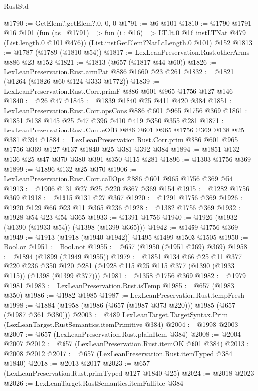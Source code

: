 \begin{lexlean}{RustStd}
\begin{coremodule}
@1790 := GetElem?.getElem?.{0, 0, 0}
@1791 := @6 @101
@1810 := @1790
    @1791
    @16
    @101
    (fun (as : @1791) => fun (i : @16) => LT.lt.{0} @16 instLTNat @479 (List.length.{0} @101 @476))
    (List.instGetElem?NatLtLength.{0} @101)
    @152
@1813 := @1787 (@1789 (@1810 @54))
@1817 := LexLeanPreservation.Rust.otherArms @886 @23 @152
@1821 := @1813 (@657 (@1817 @44 @60))
@1826 := LexLeanPreservation.Rust.armPat @886 @1660 @23 @261
@1832 := @1821 (@1264 (@1826 @60 @124 @333 @1772))
@1839 := LexLeanPreservation.Rust.Corr.primF @886 @601 @965 @1756 @127 @146
@1840 := @26 @47
@1845 := @1839 @1840 @25 @411 @420 @384
@1851 := LexLeanPreservation.Rust.Corr.opsCons @886 @601 @965 @1756 @369
@1861 := @1851 @138 @145 @25 @47 @396 @410 @419 @350 @355 @281
@1871 := LexLeanPreservation.Rust.Corr.eOfB @886 @601 @965 @1756 @369 @138 @25 @381 @394
@1884 := LexLeanPreservation.Rust.Corr.prim
    @886
    @601
    @965
    @1756
    @369
    @127
    @137
    @1840
    @25
    @381
    @392
    @384
@1894 := @1851 @132 @136 @25 @47 @370 @380 @391 @350 @115 @281
@1896 := @1303 @1756 @369
@1899 := @1896 @132 @25 @370
@1906 := LexLeanPreservation.Rust.Corr.callOps @886 @601 @965 @1756 @369 @54
@1913 := @1906 @131 @27 @25 @220 @367 @369 @154
@1915 := @1282 @1756 @369
@1918 := @1915 @131 @27 @367
@1920 := @1291 @1756 @369
@1926 := @1920 @129 @66 @23 @11 @365 @236
@1928 := @1382 @1756 @369
@1932 := @1928 @54 @23 @54 @365
@1933 := @1391 @1756
@1940 := @1926 (@1932 (@1390 (@1933 @54)) (@1398 (@1399 @365)))
@1942 := @1469 @1756 @369
@1949 := @1913 (@1918 (@1940 @1942)) @1495 @1499 @1503 @1505
@1950 := Bool.or
@1951 := Bool.not
@1955 := @657 (@1950 (@1951 @369) @369)
@1958 := @1894 (@1899 (@1949 @1955))
@1979 := @1851
    @134
    @66
    @25
    @11
    @377
    @220
    @236
    @350
    @120
    @281
    (@1928 @115 @25 @115 @377 (@1390 (@1933 @115)) (@1398 (@1399 @377)))
@1981 := @1358 @1756 @369
@1982 := @1979 @1981
@1983 := LexLeanPreservation.Rust.isTemp
@1985 := @657 (@1983 @350)
@1986 := @1982 @1985
@1987 := LexLeanPreservation.Rust.tempFresh
@1998 := @1884 (@1958 (@1986 (@657 (@1987 @373 @220))) @1985 (@657 (@1987 @361 @380)))
@2003 := @489 LexLeanTarget.TargetSyntax.Prim (LexLeanTarget.RustSemantics.itemPrimitive @384)
@2004 := @1998 @2003
@2007 := @657 (LexLeanPreservation.Rust.plainItem @384)
@2008 := @2004 @2007
@2012 := @657 (LexLeanPreservation.Rust.itemOK @601 @384)
@2013 := @2008 @2012
@2017 := @657 (LexLeanPreservation.Rust.itemTyped @384 @1840)
@2018 := @2013 @2017
@2023 := @657 (LexLeanPreservation.Rust.primTyped @127 @1840 @25)
@2024 := @2018 @2023
@2026 := LexLeanTarget.RustSemantics.itemFallible @384

\end{coremodule}
\end{lexlean}

